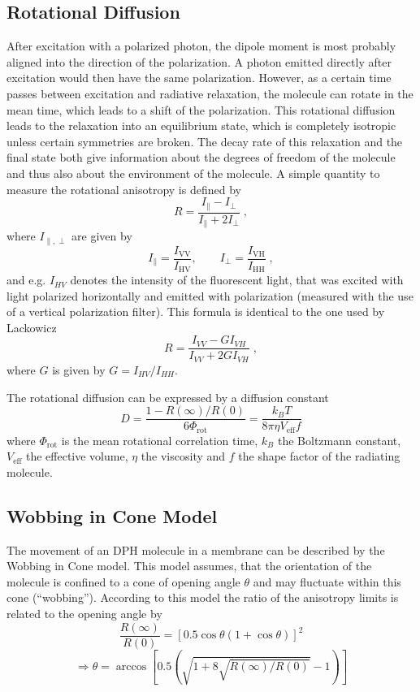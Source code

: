 \documentclass{scrartcl}
\numberwithin{equation}{section}
\numberwithin{figure}{section}
\numberwithin{table}{section}
\newcommand{\eq}[2]{\begin{equation}#1\label{#2}\end{equation}}
\begin{document}
\subsection{Rotational Diffusion}
After excitation with a polarized photon, the dipole moment is most probably aligned into the direction of the polarization. A photon emitted directly after excitation would then have the same polarization. However, as a certain time passes between excitation and radiative relaxation, the molecule can rotate in the mean time, which leads to a shift of the polarization. This rotational diffusion leads to the relaxation into an equilibrium state, which is completely isotropic unless certain symmetries are broken. The decay rate of this relaxation and the final state both give information about the degrees of freedom of the molecule and thus also about the environment of the molecule. A simple quantity to measure the rotational anisotropy is defined by
\eq{R=\frac{I_\parallel -I_\perp}{I_\parallel+ 2I_\perp} \; ,}{R}
where $I_{\parallel,\perp }$ are given by
\eq{I_\parallel = \frac{I_\text{VV}}{I_\text{HV}} , \qquad I_\perp = \frac{I_\text{VH}}{I_\text{HH}} \; , }{idef}
and e.g. $I_{HV}$ denotes the intensity of the fluorescent light, that was excited with light polarized horizontally and emitted with  polarization (measured with the use of a vertical polarization filter). This formula is identical to the one used by Lackowicz \cite{lako}
\eq{R=\frac{I_{VV} - G I_{VH}}{I_{VV}+ 2 G I_{VH}} \; ,}{Ralt}
where $G$ is given by $G=I_{HV}/I_{HH}$.

The rotational diffusion can be expressed by a diffusion constant \cite{heyn}
\eq{ D = \frac{1-R(\infty)/R(0)}{6\Phi_\text{rot}} = \frac{k_B T}{8\pi \eta V_\text{eff} f} }{eq:diff}
where $\Phi_\text{rot}$ is the mean rotational correlation time, $k_B$ the Boltzmann constant, $V_\text{eff}$ the effective volume, $\eta$ the viscosity and $f$ the shape factor of the radiating molecule.

\subsection{Wobbing in Cone Model}
The movement of an DPH molecule in a membrane can be described by the Wobbing in Cone model. This model assumes, that the orientation of the molecule is confined to a cone of opening angle $\theta$ and may fluctuate within this cone (``wobbing''). According to this model the ratio of the anisotropy limits is related to the opening angle by
\eq{ \frac{R(\infty)}{R(0)} = \left[ 0.5 \cos \theta (1+\cos \theta) \right]^2 }{}
\eq{ \Rightarrow \theta = \arccos \left[ 0.5\left( \sqrt{1+8\sqrt{R(\infty)/R(0)}}-1 \right) \right] }{eq:theta}
\end{document}
